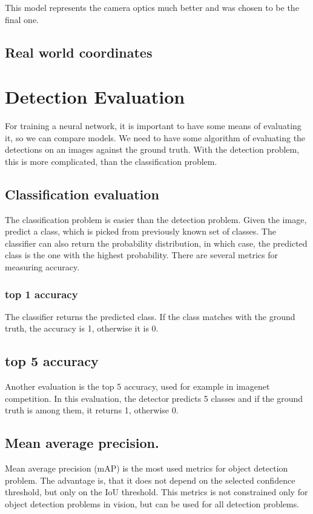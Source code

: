 \documentclass[a4paper,12pt,titlepage, twoside]{article}
\numberwithin{figure}{section}
\begin{document}
This model represents the camera optics much better and was chosen to be the final one.

\subsection{Real world coordinates}








\section{Detection Evaluation}
For training a neural network, it is important to have some means of evaluating it, so we can compare models. We need to have some algorithm of evaluating the detections on an images against the ground truth. With the detection problem, this is more complicated, than the classification problem.

\subsection{Classification evaluation}

The classification problem is easier than the detection problem. Given the image, predict a class, which is picked from previously known set of classes. The classifier can also return the probability distribution, in which case, the predicted class is the one with the highest probability. There are several metrics for measuring accuracy.

\subsubsection{top 1 accuracy}

The classifier returns the predicted class. If the class matches with the ground truth, the accuracy is 1, otherwise it is 0.

\subsection{top 5 accuracy}

Another evaluation is the top 5 accuracy, used for example in imagenet \cite{imagenet} competition. In this evaluation, the detector predicts 5 classes and if the ground truth is among them, it returns 1, otherwise 0. 

\subsection{Mean average precision.}
Mean average precision (mAP) is the most used metrics for object detection problem. The advantage is, that it does not depend on the selected confidence threshold, but only on the IoU threshold. This metrics is not constrained only for object detection problems in vision, but can be used for all detection problems. 
\end{document}
